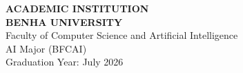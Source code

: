 \begin{center}
\vspace{1cm}

\begin{tcolorbox}[
    colback=brandAccent!5,
    colframe=brandAccent,
    boxrule=1pt,
    arc=3pt,
    width=0.8\textwidth,
    halign=center
]
\textbf{ACADEMIC INSTITUTION}\\[0.5em]
\textbf{BENHA UNIVERSITY}\\
Faculty of Computer Science and Artificial Intelligence\\
AI Major (BFCAI)\\
Graduation Year: July 2026
\end{tcolorbox}

\end{center}

\vspace*{\fill}


\clearpage
